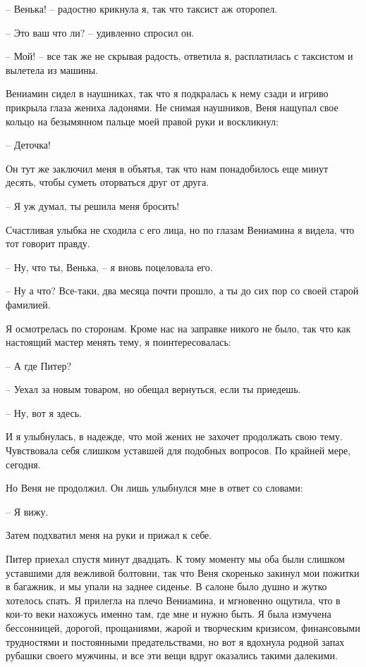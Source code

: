 \documentclass[
]{book}
\begin{document}
-- Венька! -- радостно крикнула я, так что таксист аж оторопел.

-- Это ваш что ли? -- удивленно спросил он.

-- Мой! -- все так же не скрывая радость, ответила я, расплатилась с таксистом и вылетела из машины.

Вениамин сидел в наушниках, так что я подкралась к нему сзади и игриво прикрыла глаза жениха ладонями. Не снимая наушников, Веня нащупал свое кольцо на безымянном пальце моей правой руки и воскликнул:

-- Деточка!

Он тут же заключил меня в объятья, так что нам понадобилось еще минут десять, чтобы суметь оторваться друг от друга.

-- Я уж думал, ты решила меня бросить!

Счастливая улыбка не сходила с его лица, но по глазам Вениамина я видела, что тот говорит правду.

-- Ну, что ты, Венька, -- я вновь поцеловала его.

-- Ну а что? Все-таки, два месяца почти прошло, а ты до сих пор со своей старой фамилией.

Я осмотрелась по сторонам. Кроме нас на заправке никого не было, так что как настоящий мастер менять тему, я поинтересовалась:

-- А где Питер?

-- Уехал за новым товаром, но обещал вернуться, если ты приедешь.

-- Ну, вот я здесь.

И я улыбнулась, в надежде, что мой жених не захочет продолжать свою тему. Чувствовала себя слишком уставшей для подобных вопросов. По крайней мере, сегодня.

Но Веня не продолжил. Он лишь улыбнулся мне в ответ со словами:

-- Я вижу.

Затем подхватил меня на руки и прижал к себе.

Питер приехал спустя минут двадцать. К тому моменту мы оба были слишком уставшими для вежливой болтовни, так что Веня скоренько закинул мои пожитки в багажник, и мы упали на заднее сиденье. В салоне было душно и жутко хотелось спать. Я прилегла на плечо Вениамина, и мгновенно ощутила, что в кои-то веки нахожусь именно там, где мне и нужно быть. Я была измучена бессонницей, дорогой, прощаниями, жарой и творческим кризисом, финансовыми трудностями и постоянными предательствами, но вот я вдохнула родной запах рубашки своего мужчины, и все эти вещи вдруг оказались такими далекими.
\end{document}
